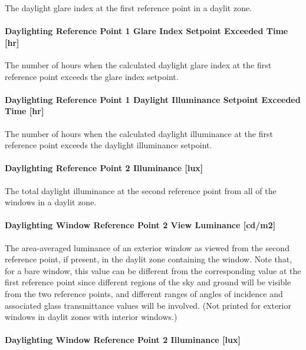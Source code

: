 The daylight glare index at the first reference point in a daylit zone.

\paragraph{Daylighting Reference Point 1 Glare Index Setpoint Exceeded Time {[}hr{]}}\label{daylighting-reference-point-1-glare-index-setpoint-exceeded-time-hr}

The number of hours when the calculated daylight glare index at the first reference point exceeds the glare index setpoint.

\paragraph{Daylighting Reference Point 1 Daylight Illuminance Setpoint Exceeded Time {[}hr{]}}\label{daylighting-reference-point-1-daylight-illuminance-setpoint-exceeded-time-hr}

The number of hours when the calculated daylight illuminance at the first reference point exceeds the daylight illuminance setpoint.

\paragraph{Daylighting Reference Point 2 Illuminance {[}lux{]}}\label{daylighting-reference-point-2-illuminance-lux}

The total daylight illuminance at the second reference point from all of the windows in a daylit zone.

\paragraph{Daylighting Window Reference Point 2 View Luminance {[}cd/m2{]}}\label{daylighting-window-reference-point-2-view-luminance-cdm2}

The area-averaged luminance of an exterior window as viewed from the second reference point, if present, in the daylit zone containing the window. Note that, for a bare window, this value can be different from the corresponding value at the first reference point since different regions of the sky and ground will be visible from the two reference points, and different ranges of angles of incidence and associated glass transmittance values will be involved. (Not printed for exterior windows in daylit zones with interior windows.)

\paragraph{Daylighting Window Reference Point 2 Illuminance {[}lux{]}}\label{daylighting-window-reference-point-2-illuminance-lux}


